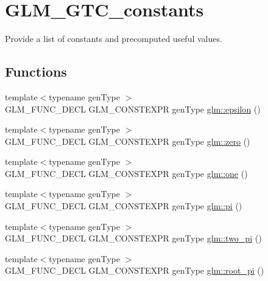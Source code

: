 \hypertarget{group__gtc__constants}{}\section{G\+L\+M\+\_\+\+G\+T\+C\+\_\+constants}
\label{group__gtc__constants}


Provide a list of constants and precomputed useful values.  


\subsection*{Functions}
\begin{DoxyCompactItemize}
\item 
{\footnotesize template$<$typename gen\+Type $>$ }\\G\+L\+M\+\_\+\+F\+U\+N\+C\+\_\+\+D\+E\+CL G\+L\+M\+\_\+\+C\+O\+N\+S\+T\+E\+X\+PR gen\+Type \hyperlink{group__gtc__constants_ga2a1e57fc5592b69cfae84174cbfc9429}{glm\+::epsilon} ()
\item 
{\footnotesize template$<$typename gen\+Type $>$ }\\G\+L\+M\+\_\+\+F\+U\+N\+C\+\_\+\+D\+E\+CL G\+L\+M\+\_\+\+C\+O\+N\+S\+T\+E\+X\+PR gen\+Type \hyperlink{group__gtc__constants_ga788f5a421fc0f40a1296ebc094cbaa8a}{glm\+::zero} ()
\item 
{\footnotesize template$<$typename gen\+Type $>$ }\\G\+L\+M\+\_\+\+F\+U\+N\+C\+\_\+\+D\+E\+CL G\+L\+M\+\_\+\+C\+O\+N\+S\+T\+E\+X\+PR gen\+Type \hyperlink{group__gtc__constants_ga39c2fb227631ca25894326529bdd1ee5}{glm\+::one} ()
\item 
{\footnotesize template$<$typename gen\+Type $>$ }\\G\+L\+M\+\_\+\+F\+U\+N\+C\+\_\+\+D\+E\+CL G\+L\+M\+\_\+\+C\+O\+N\+S\+T\+E\+X\+PR gen\+Type \hyperlink{group__gtc__constants_ga94bafeb2a0f23ab6450fed1f98ee4e45}{glm\+::pi} ()
\item 
{\footnotesize template$<$typename gen\+Type $>$ }\\G\+L\+M\+\_\+\+F\+U\+N\+C\+\_\+\+D\+E\+CL G\+L\+M\+\_\+\+C\+O\+N\+S\+T\+E\+X\+PR gen\+Type \hyperlink{group__gtc__constants_gaa5276a4617566abcfe49286f40e3a256}{glm\+::two\+\_\+pi} ()
\item 
{\footnotesize template$<$typename gen\+Type $>$ }\\G\+L\+M\+\_\+\+F\+U\+N\+C\+\_\+\+D\+E\+CL G\+L\+M\+\_\+\+C\+O\+N\+S\+T\+E\+X\+PR gen\+Type \hyperlink{group__gtc__constants_ga261380796b2cd496f68d2cf1d08b8eb9}{glm\+::root\+\_\+pi} ()

\end{DoxyCompactItemize}
